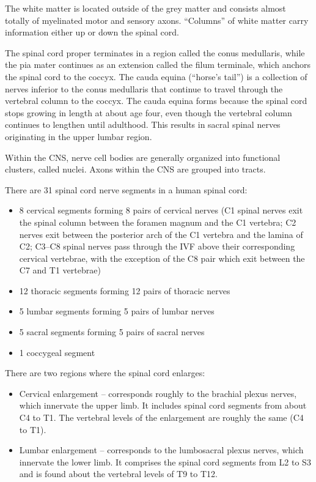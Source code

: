 \documentclass[]{book}
\providecommand{\tightlist}{%
  \setlength{\itemsep}{0pt}\setlength{\parskip}{0pt}}
\begin{document}
The white matter is located outside of the grey matter and consists almost totally of myelinated motor and sensory axons. ``Columns'' of white matter carry information either up or down the spinal cord.

The spinal cord proper terminates in a region called the conus medullaris, while the pia mater continues as an extension called the filum terminale, which anchors the spinal cord to the coccyx. The cauda equina (``horse's tail'') is a collection of nerves inferior to the conus medullaris that continue to travel through the vertebral column to the coccyx. The cauda equina forms because the spinal cord stops growing in length at about age four, even though the vertebral column continues to lengthen until adulthood. This results in sacral spinal nerves originating in the upper lumbar region.

Within the CNS, nerve cell bodies are generally organized into functional clusters, called nuclei. Axons within the CNS are grouped into tracts.

There are 31 spinal cord nerve segments in a human spinal cord:

\begin{itemize}
\tightlist
\item
  8 cervical segments forming 8 pairs of cervical nerves (C1 spinal nerves exit the spinal column between the foramen magnum and the C1 vertebra; C2 nerves exit between the posterior arch of the C1 vertebra and the lamina of C2; C3--C8 spinal nerves pass through the IVF above their corresponding cervical vertebrae, with the exception of the C8 pair which exit between the C7 and T1 vertebrae)
\item
  12 thoracic segments forming 12 pairs of thoracic nerves
\item
  5 lumbar segments forming 5 pairs of lumbar nerves
\item
  5 sacral segments forming 5 pairs of sacral nerves
\item
  1 coccygeal segment
\end{itemize}

There are two regions where the spinal cord enlarges:

\begin{itemize}
\tightlist
\item
  Cervical enlargement -- corresponds roughly to the brachial plexus nerves, which innervate the upper limb. It includes spinal cord segments from about C4 to T1. The vertebral levels of the enlargement are roughly the same (C4 to T1).
\item
  Lumbar enlargement -- corresponds to the lumbosacral plexus nerves, which innervate the lower limb. It comprises the spinal cord segments from L2 to S3 and is found about the vertebral levels of T9 to T12.
\end{itemize}
\end{document}
